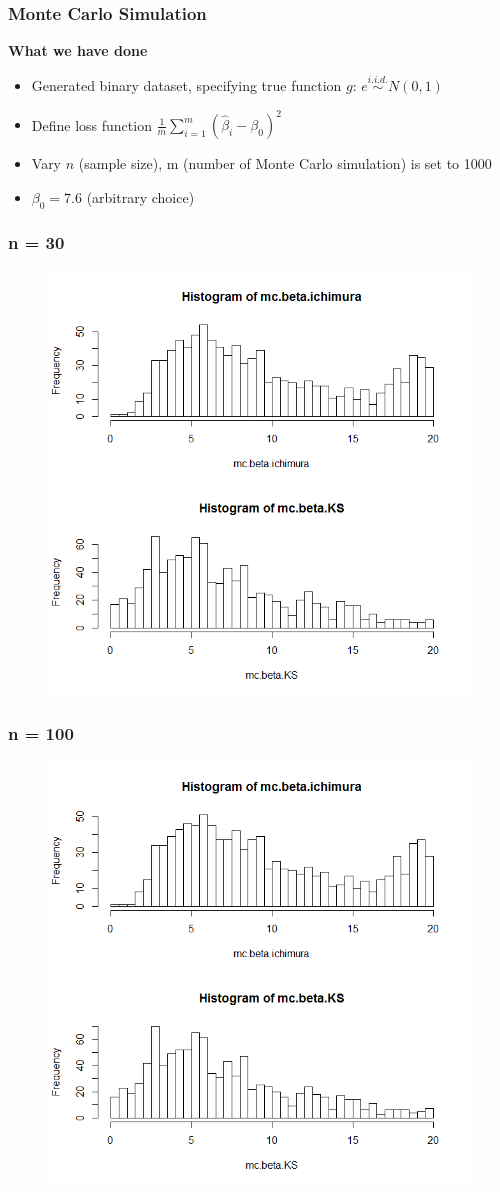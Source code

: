 \documentclass{beamer}
\begin{document}
\begin{frame}[t]
	\frametitle{Monte Carlo Simulation}

	\textbf{What we have done}
	\begin{itemize}
		\item Generated binary dataset, specifying true function $g$: $ e \overset{i.i.d.}{\sim} N(0, 1)$
		\item Define loss function $ \frac{1}{m}\sum_{i=1}^{m}(\hat{\beta}_i - \beta_0)^2 $
		\item Vary $n$ (sample size), m (number of Monte Carlo simulation) is set to 1000
                    \item $\beta_0 = 7.6$ (arbitrary choice)
     \end{itemize}
\end{frame}


\begin{frame}
\frametitle{n = 30}
\begin{figure}
\includegraphics[width=0.6\linewidth]{30.png}
\end{figure}
\end{frame}



\begin{frame}
\frametitle{n = 100}
\begin{figure}
\includegraphics[width=0.6\linewidth]{100.png}
\end{figure}
\end{frame}
\end{document}
